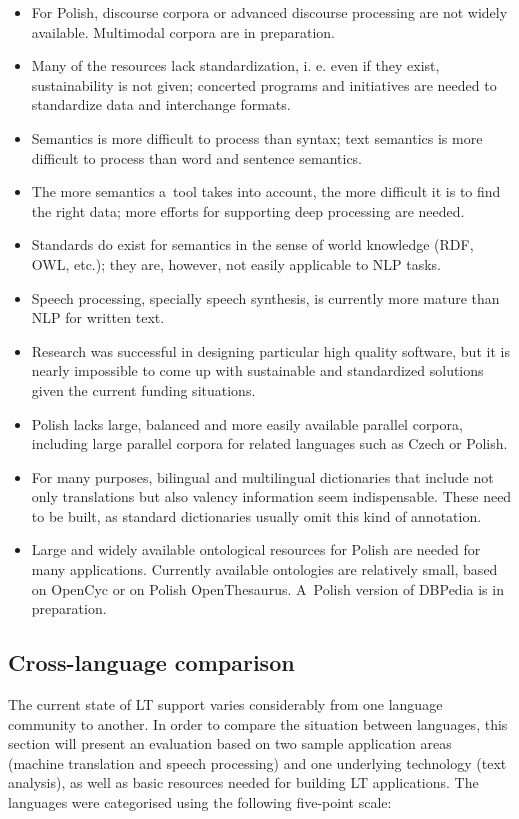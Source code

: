 \begin{multicols}{2}
\begin{itemize} \item For Polish, discourse corpora or advanced
discourse processing are not widely available. Multimodal corpora are
in preparation. \item Many of the resources lack standardization, i.
e. even if they exist, sustainability is not given; concerted programs
and initiatives are needed to standardize data and interchange
formats. \item Semantics is more difficult to process than syntax;
text semantics is more difficult to process than word and sentence
semantics. \item The more semantics a~tool takes into account, the
more difficult it is to find the right data; more efforts for
supporting deep processing are needed. \item Standards do exist for
semantics in the sense of world knowledge (RDF, OWL, etc.); they are,
however, not easily applicable to NLP tasks. \item Speech processing,
specially speech synthesis, is currently more mature than NLP for
written text. \item Research was successful in designing particular
high quality software, but it is nearly impossible to come up with
sustainable and standardized solutions given the current funding
situations. \item Polish lacks large, balanced and more easily
available parallel corpora, including large parallel corpora for
related languages such as Czech or Polish. \item For many purposes,
bilingual and multilingual dictionaries that include not only
translations but also valency information seem indispensable. These
need to be built, as standard dictionaries usually omit this kind of
annotation. \item Large and widely available ontological resources for
Polish are needed for many applications. Currently available
ontologies are relatively small, based on OpenCyc or on Polish
OpenThesaurus. A~Polish version of DBPedia is in preparation.
\end{itemize} 

\subsection{Cross-language comparison} The current state of LT support
varies considerably from one language community to another. In order
to compare the situation between languages, this section will present
an evaluation based on two sample application areas (machine
translation and speech processing) and one underlying technology (text
analysis), as well as basic resources needed for building LT
applications. The languages were categorised using the following
five-point scale: 


\end{multicols}
